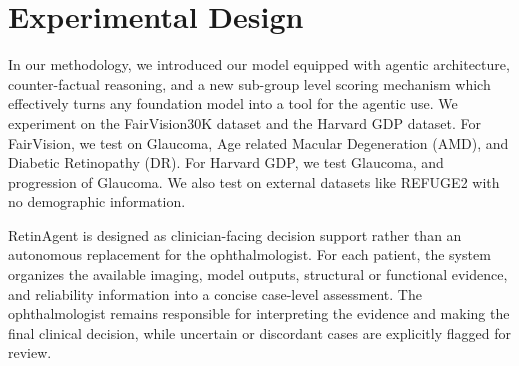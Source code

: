 \section{Experimental Design}\label{sec:experiments}
In our methodology, we introduced our model equipped with agentic architecture, counter-factual reasoning, and a new sub-group level scoring mechanism which effectively turns any foundation model into a tool for the agentic use. We experiment on the FairVision30K dataset and the Harvard GDP dataset. For FairVision, we test on Glaucoma, Age related Macular Degeneration (AMD), and Diabetic Retinopathy (DR). For Harvard GDP, we test Glaucoma, and progression of Glaucoma. We also test on external datasets like REFUGE2 with no demographic information.

RetinAgent is designed as clinician-facing decision support rather than an
autonomous replacement for the ophthalmologist. For each patient, the system
organizes the available imaging, model outputs, structural or functional
evidence, and reliability information into a concise case-level assessment.
The ophthalmologist remains responsible for interpreting the evidence and
making the final clinical decision, while uncertain or discordant cases are
explicitly flagged for review.
